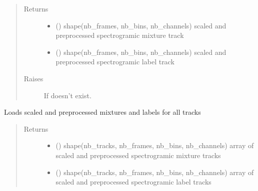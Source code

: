 \documentclass[letterpaper,10pt,english,openany,oneside]{sphinxmanual}
\begin{document}
\begin{fulllineitems}
\begin{fulllineitems}
\begin{quote}
\begin{description}
\item[{Returns}] \leavevmode
\begin{itemize}
\item {} 
 () \textendash{} shape(nb\_frames, nb\_bins, nb\_channels)
scaled and preprocessed spectrogramic mixture track

\item {} 
 () \textendash{} shape(nb\_frames, nb\_bins, nb\_channels)
scaled and preprocessed spectrogramic label track

\end{itemize}


\item[{Raises}] \leavevmode
{} \textendash{} If  doesn’t exist.

\end{description}\end{quote}

\end{fulllineitems}


\begin{fulllineitems}
\label{\detokenize{docs/source/dataset:dataset.Dataset.load_all_tracks}}
Loads scaled and preprocessed mixtures and labels for all tracks
\begin{quote}\begin{description}
\item[{Returns}] \leavevmode
\begin{itemize}
\item {} 
 () \textendash{} shape(nb\_tracks, nb\_frames, nb\_bins, nb\_channels)
array of scaled and preprocessed spectrogramic mixture tracks

\item {} 
 () \textendash{} shape(nb\_tracks, nb\_frames, nb\_bins, nb\_channels)
array of scaled and preprocessed spectrogramic label tracks

\end{itemize}


\end{description}\end{quote}


\end{fulllineitems}
\end{fulllineitems}
\end{document}
